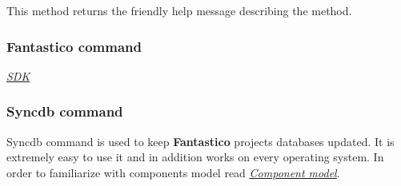 \documentclass[letterpaper,10pt,english]{sphinxmanual}
\begin{document}
\begin{fulllineitems}
\begin{fulllineitems}
\end{fulllineitems}


\begin{fulllineitems}
\label{features/sdk/command_activate_extension:fantastico.sdk.commands.command_activate_extension.SdkCommandActivateExtension.get_help}
This method returns the friendly help message describing the method.

\end{fulllineitems}


\end{fulllineitems}



\subsubsection{Fantastico command}
\label{features/sdk/command_fantastico:fantastico-command}\label{features/sdk/command_fantastico::doc}
{\hyperref[features/sdk::doc]{\emph{SDK}}}


\subsubsection{Syncdb command}
\label{features/sdk/command_syncdb::doc}\label{features/sdk/command_syncdb:syncdb-command}
Syncdb command is used to keep \textbf{Fantastico} projects databases updated. It is extremely easy to use it and in addition works
on every operating system. In order to familiarize with components model read {\hyperref[features/component_model::doc]{\emph{Component model}}}.
\end{document}
